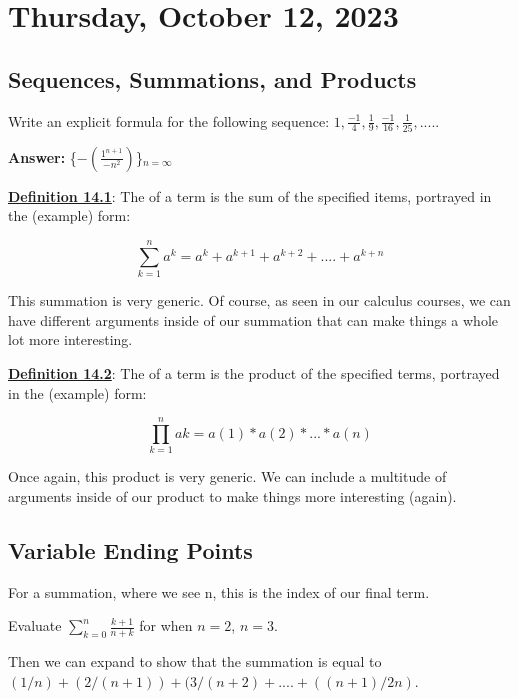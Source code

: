 \section{Thursday, October 12, 2023}

\subsection{Sequences, Summations, and Products}
\begin{example}
    Write an explicit formula for the following sequence: $1, \frac{-1}{4}, \frac{1}{9}, \frac{-1}{16}, \frac{1}{25}, .....$
\end{example}

\textbf{Answer:}  \{$-(\frac{1^{n+1}}{-n^2})$\}$_{n=\infty}$

\textbf{\underline{Definition 14.1}}: The  of a term is the sum of the specified items, portrayed in the (example) form:

\begin{displaymath}
    \sum_{k=1}^{n}a^k=a^k+a^{k+1}+a^{k+2}+....+a^{k+n}
\end{displaymath}

This summation is very generic. Of course, as seen in our calculus courses, we can have different arguments inside of our summation that can make things a whole lot more interesting.

\textbf{\underline{Definition 14.2}}: The  of a term is the product of the specified terms, portrayed in the (example) form:

\begin{displaymath}
    \prod_{k=1}^{n}ak=a(1)*a(2)*...*a(n)
\end{displaymath}

Once again, this product is very generic. We can include a multitude of arguments inside of our product to make things more interesting (again).

\subsection{Variable Ending Points}
For a summation, where we see n, this is the index of our final term. 

\begin{example}
    Evaluate $\sum_{k=0}^{n}\frac{k+1}{n+k}$ for when $n = 2$, $n=3$.
\end{example}

Then we can expand to show that the summation is equal to $(1/n)+(2/(n+1))+(3/(n+2)+....+((n+1)/2n)$.

